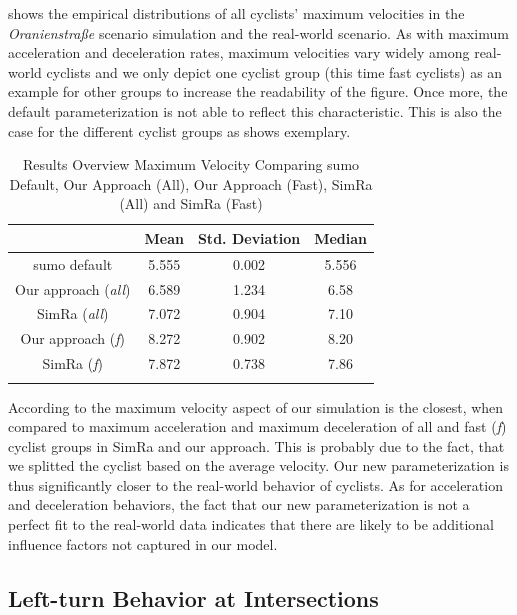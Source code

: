  shows the empirical distributions of all cyclists' maximum velocities in the \textit{Oranienstraße} scenario simulation and the real-world scenario.
As with maximum acceleration and deceleration rates, maximum velocities vary widely among real-world cyclists and we only depict one cyclist group (this time fast cyclists) as an example for other groups to increase the readability of the figure.
Once more, the default parameterization is not able to reflect this characteristic.
This is also the case for the different cyclist groups as  shows exemplary.
\begin{table}
\centering
\caption{Results Overview Maximum Velocity Comparing \ac{sumo} Default, Our Approach (All), Our Approach (Fast), SimRa (All) and SimRa (Fast)}%
\label{tab:results_overview_vel}
\begin{tabular}{cccc}
\toprule
& Mean & Std. Deviation & Median\\
\midrule
\midrule
\ac{sumo} default & \num{5.555} & \num{0.002} & \num{5.556} \\
\midrule
Our approach (\textit{all}) & \num{6.589} & \num{1.234} & \num{6.58} \\
SimRa (\textit{all}) & \num{7.072} & \num{0.904} & \num{7.10} \\
\midrule
Our approach (\textit{f}) & \num{8.272} & \num{0.902} & \num{8.20} \\
SimRa (\textit{f}) & \num{7.872} & \num{0.738} & \num{7.86} \\
\bottomrule&
\end{tabular}
\end{table}
According to  the maximum velocity aspect of our simulation is the closest, when compared to maximum acceleration and maximum deceleration of all and fast (\textit{f}) cyclist groups in SimRa and our approach.
This is probably due to the fact, that we splitted the cyclist based on the average velocity.
Our new parameterization is thus significantly closer to the real-world behavior of cyclists.
As for acceleration and deceleration behaviors, the fact that our new parameterization is not a perfect fit to the real-world data indicates that there are likely to be additional influence factors not captured in our model.

\subsection{Left-turn Behavior at Intersections}
\label{subsec:left-turn_behavior_at_intersections_evaluation}

